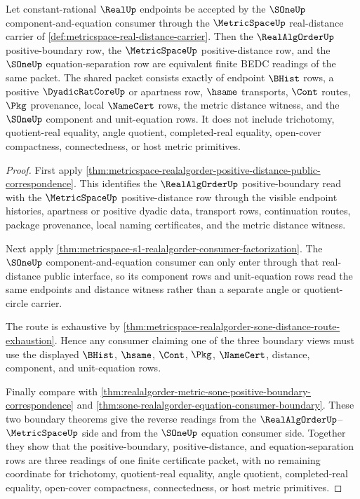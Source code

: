 \begin{theorem}
\label{thm:metricspace-realalgorder-sone-positive-boundary-equivalence}
Let constant-rational $\RealUp$ endpoints be accepted by the $\SOneUp$
component-and-equation consumer through the $\MetricSpaceUp$ real-distance
carrier of \autoref{def:metricspace-real-distance-carrier}. Then the
$\RealAlgOrderUp$ positive-boundary row, the $\MetricSpaceUp$
positive-distance row, and the $\SOneUp$ equation-separation row are
equivalent finite BEDC readings of the same packet. The shared packet consists
exactly of endpoint $\BHist$ rows, a positive $\DyadicRatCoreUp$ or apartness
row, $\hsame$ transports, $\Cont$ routes, $\Pkg$ provenance, local
$\NameCert$ rows, the metric distance witness, and the $\SOneUp$ component
and unit-equation rows. It does not include trichotomy, quotient-real
equality, angle quotient, completed-real equality, open-cover compactness,
connectedness, or host metric primitives.
\end{theorem}
\begin{proof}
First apply
\autoref{thm:metricspace-realalgorder-positive-distance-public-correspondence}.
This identifies the $\RealAlgOrderUp$ positive-boundary read with the
$\MetricSpaceUp$ positive-distance row through the visible endpoint histories,
apartness or positive dyadic data, transport rows, continuation routes,
package provenance, local naming certificates, and the metric distance
witness.

Next apply
\autoref{thm:metricspace-s1-realalgorder-consumer-factorization}. The
$\SOneUp$ component-and-equation consumer can only enter through that
real-distance public interface, so its component rows and unit-equation rows
read the same endpoints and distance witness rather than a separate angle or
quotient-circle carrier.

The route is exhaustive by
\autoref{thm:metricspace-realalgorder-sone-distance-route-exhaustion}. Hence
any consumer claiming one of the three boundary views must use the displayed
$\BHist$, $\hsame$, $\Cont$, $\Pkg$, $\NameCert$, distance, component, and
unit-equation rows.

Finally compare with
\autoref{thm:realalgorder-metric-sone-positive-boundary-correspondence} and
\autoref{thm:sone-realalgorder-equation-consumer-boundary}. These two
boundary theorems give the reverse readings from the
$\RealAlgOrderUp$--$\MetricSpaceUp$ side and from the $\SOneUp$ equation
consumer side. Together they show that the positive-boundary,
positive-distance, and equation-separation rows are three readings of one
finite certificate packet, with no remaining coordinate for trichotomy,
quotient-real equality, angle quotient, completed-real equality,
open-cover compactness, connectedness, or host metric primitives.
\end{proof}
